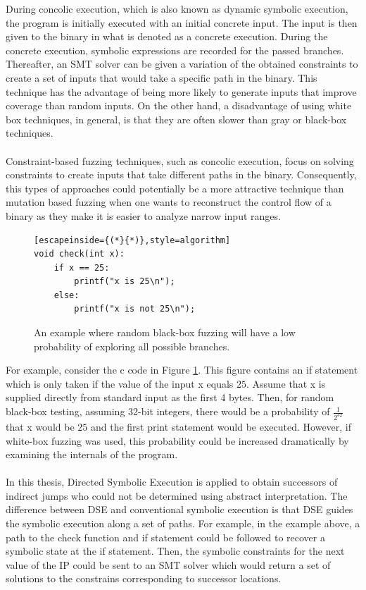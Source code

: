 \documentclass{kththesis}
\begin{document}
During concolic execution, which is also known as dynamic symbolic execution, the program is initially executed with an initial concrete input. The input is then given to the binary in what is denoted as a concrete execution. During the concrete execution, symbolic expressions are recorded for the passed branches. Thereafter, an SMT solver can be given a variation of the obtained constraints to create a set of inputs that would take a specific path in the binary. This technique has the advantage of being more likely to generate inputs that improve coverage than random inputs\cite{fuzzingSurvey}. On the other hand, a disadvantage of using white box techniques, in general, is that they are often slower than gray or black-box techniques\cite{fuzzingSurvey}.
\\ \\
Constraint-based fuzzing techniques, such as concolic execution, focus on solving constraints to create inputs that take different paths in the binary. Consequently, this types of approaches could potentially be a more attractive technique than mutation based fuzzing when one wants to reconstruct the control flow of a binary as they make it is easier to analyze narrow input ranges.
\clearpage
\begin{figure}[!t]
    \centering
\begin{algorithmFrame}
\begin{lstlisting}[escapeinside={(*}{*)},style=algorithm]
void check(int x):
    if x == 25:
        printf("x is 25\n");
    else:
        printf("x is not 25\n");
\end{lstlisting}
\end{algorithmFrame}
\caption{An example where random black-box fuzzing will have a low probability of exploring all possible branches.}
    \label{fig:if25}
\end{figure}
\noindent
For example, consider the c code in Figure \ref{fig:if25}. This figure contains an if statement which is only taken if the value of the input x equals $25$. Assume that x is supplied directly from standard input as the first 4 bytes. Then, for random black-box testing, assuming 32-bit integers, there would be a probability of $\frac{1}{2^{32}}$ that x would be $25$ and the first print statement would be executed. However, if white-box fuzzing was used, this probability could be increased dramatically by examining the internals of the program.
\\ \\
In this thesis, Directed Symbolic Execution is applied to obtain successors of indirect jumps who could not be determined using abstract interpretation. The difference between DSE and conventional symbolic execution is that DSE guides the symbolic execution along a set of paths. For example, in the example above, a path to the check function and if statement could be followed to recover a symbolic state at the if statement. Then, the symbolic constraints for the next value of the IP could be sent to an SMT solver which would return a set of solutions to the constrains corresponding to successor locations.
\end{document}
